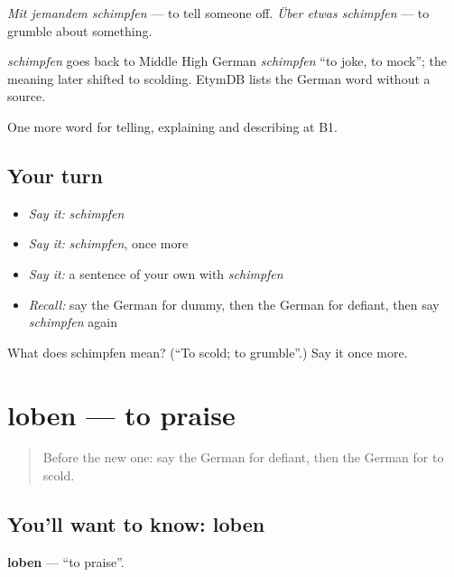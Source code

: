 \emph{Mit jemandem schimpfen} — to tell someone off. \emph{Über etwas schimpfen} — to grumble about something.

\begin{cousinweb}
\emph{schimpfen} goes back to Middle High German \emph{schimpfen} \textquotedblleft{}to joke, to mock\textquotedblright{}; the meaning later shifted to scolding. EtymDB lists the German word without a source.
\end{cousinweb}

\begin{grammarlens}[title={What you've built}]
One more word for telling, explaining and describing at B1.
\end{grammarlens}

\subsection*{Your turn}
\begin{itemize}
\raggedright
  \item \emph{Say it:} \emph{schimpfen}
  \item \emph{Say it:} \emph{schimpfen}, once more
  \item \emph{Say it:} a sentence of your own with \emph{schimpfen}
  \item \emph{Recall:} say the German for dummy, then the German for defiant, then say \emph{schimpfen} again
\end{itemize}

\begin{tcolorbox}[breakable,colback=teal!4,colframe=teal!35!black,title={Before you move on}]
What does schimpfen mean? (\textquotedblleft{}To scold; to grumble\textquotedblright{}.) Say it once more.
\end{tcolorbox}
\section[loben]{loben — to praise}

\label{lesson:GE-C497-loben}



\begin{quote}
Before the new one: say the German for defiant, then the German for to scold.
\end{quote}

\subsection*{You'll want to know: loben}
\textbf{loben} — \textquotedblleft{}to praise\textquotedblright{}.

